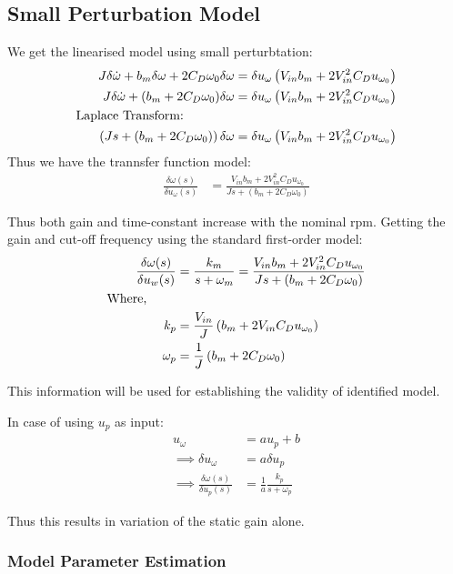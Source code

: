 \subsection{Small Perturbation Model}
We get the linearised model using small perturbtation:
\begin{align*}
    J \delta \dot \omega + b_m \delta \omega + 2 C_D \omega_0 \delta \omega  &= \delta u_\omega \left( V_{in} b_m + 2V_{in}^2 C_D u_{\omega_0} \right)\\
    J \delta \dot \omega + (b_m + 2 C_D \omega_0) \delta \omega  &= \delta u_\omega \left( V_{in} b_m + 2V_{in}^2 C_D u_{\omega_0} \right)\\
    \text{Laplace Transform:} \qquad \qquad &\\
     \left( Js + (b_m + 2 C_D \omega_0) \right) \delta \omega  &= \delta u_\omega \left( V_{in} b_m + 2V_{in}^2 C_D u_{\omega_0} \right)
\end{align*}
Thus we have the trannsfer function model:
\begin{align*}
    \frac{\delta \omega(s)}{\delta u_\omega (s)} &= \frac{V_{in} b_m + 2V_{in}^2 C_D u_{\omega_0}}{Js + (b_m + 2 C_D \omega_0)}
\end{align*}

Thus both gain and time-constant increase with the nominal rpm. Getting the gain and cut-off frequency using the standard first-order model:
\begin{align*}
    \frac{\delta \omega(s)}{\delta u_w(s)} &= \frac{k_m}{s + \omega_m} = \frac{V_{in} b_m + 2V_{in}^2C_D u_{\omega_0}}{Js + (b_m + 2 C_D \omega_0)}\\
    \text{Where, } \qquad &\\
    k_p &= \frac{V_{in}}{J} \left(  b_m + 2V_{in}C_D u_{\omega_0} \right)\\
    \omega_p &= \frac{1}{J}\left( b_m + 2 C_D \omega_0 \right)
\end{align*}

This information will be used for establishing the validity of identified model.

In case of using $u_p$ as input:
\begin{align*}
    u_\omega &= a u_p + b\\
    \implies \delta u_\omega &= a \delta u_p\\
    \implies \frac{\delta \omega(s)}{\delta u_p(s)} &= \frac{1}{a}\frac{k_p}{s + \omega_p}
\end{align*}

Thus this results in variation of the static gain alone.


\subsubsection{Model Parameter Estimation}
